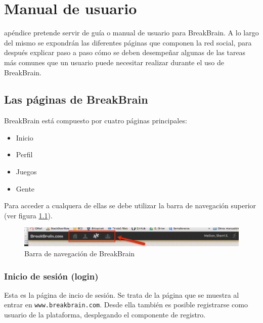 \chapter{Manual de usuario}
\label{chap::manual}

 apéndice pretende servir de guía o manual de usuario para BreakBrain. A lo largo del mismo se expondrán las diferentes páginas que componen la red social, para después explicar paso a paso cómo se deben desempeñar algunas de las tareas más comunes que un usuario puede necesitar realizar durante el uso de BreakBrain.

\section{Las páginas de BreakBrain}

BreakBrain está compuesto por cuatro páginas principales:

\begin{itemize}
\item Inicio
\item Perfil
\item Juegos
\item Gente
\end{itemize}

Para acceder a cualquera de ellas se debe utilizar la barra de navegación superior (ver figura \ref{fig::navigation-bar}).

\begin{figure}[h]
  \begin{center}
    \includegraphics[width=\textwidth]{./images/navigation-bar.png}
  \end{center}  
  \caption{Barra de navegación de BreakBrain}
  \label{fig::navigation-bar}
\end{figure}

\subsection{Inicio de sesión (login)}

Esta es la página de incio de sesión. Se trata de la página que se muestra al entrar en {\tt www.breakbrain.com}. Desde ella también es posible registrarse como usuario de la plataforma, desplegando el componente de registro.

